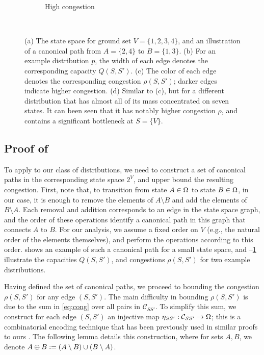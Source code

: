 \begin{figure}[tbp]
\begin{subfigure}[b]{\subflen}
    \caption{High congestion}
    \label{fig:cong4}
  \end{subfigure}\\
  \caption{(a) The state space for ground set $V = \{1, 2, 3, 4\}$, and an illustration of a canonical path from $A = \{2, 4\}$ to $B = \{1, 3\}$.
  (b) For an example distribution $p$, the width of each edge denotes the corresponding capacity $Q(S, S')$.
  (c) The color of each edge denotes the corresponding congestion $\rho(S, S')$; darker edges indicate higher congestion.
  (d) Similar to (c), but for a different distribution that has almost all of its mass concentrated on seven states.
  It can been seen that it has notably higher congestion $\rho$, and contains a significant bottleneck at $S = \{V\}$.
  }
  \label{fig:cong}
\end{figure}

\subsection{Proof of }
To apply  to our class of distributions, we need to construct a set of canonical paths in the corresponding state space $2^V$, and upper bound the resulting congestion.
First, note that, to transition from state $A \in \ss$ to state $B \in \ss$, in our case, it is enough to remove the elements of $A \setminus B$ and add the elements of $B \setminus A$.
Each removal and addition corresponds to an edge in the state space graph, and the order of these operations identify a canonical path in this graph that connects $A$ to $B$.
For our analysis, we assume a fixed order on $V$ (e.g., the natural order of the elements themselves), and perform the operations according to this order.
 shows an example of such a canonical path for a small state space, and --\ref{fig:cong4} illustrate the capacities $Q(S, S')$, and congestions $\rho(S, S')$ for two example distributions.

Having defined the set of canonical paths, we proceed to bounding the congestion $\rho(S, S')$ for any edge $(S, S')$.
The main difficulty in bounding $\rho(S, S')$ is due to the sum in \eqref{eq:cong} over all pairs in $\mathcal{C}_{SS'}$.
To simplify this sum, we construct for each edge $(S, S')$ an injective map $\ess : \mathcal{C}_{SS'} \to \ss$; this is a combinatorial encoding technique that has been previously used in similar proofs to ours \citep{jerrum03}.
The following lemma details this construction, where for sets $A, B$, we denote $A \oplus B \defeq (A \setminus B)\cup(B \setminus A)$.

